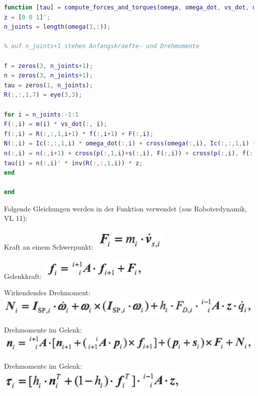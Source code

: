 \begin{lstlisting}[frame=single, basicstyle=\footnotesize, language=Matlab]
function [tau] = compute_forces_and_torques(omega, omega_dot, vs_dot, m, Ic, p, s, R)
z = [0 0 1]';
n_joints = length(omega(1,:));

% auf n_joints+1 stehen Anfangskraefte- und Drehmomente

f = zeros(3, n_joints+1);
n = zeros(3, n_joints+1);
tau = zeros(1, n_joints);
R(:,:,1,7) = eye(3,3);

for i = n_joints:-1:1
F(:,i) = m(i) * vs_dot(:, i);
f(:,i) = R(:,:,1,i+1) * f(:,i+1) + F(:,i);
N(:,i) = Ic(:,:,1,i) * omega_dot(:,i) + cross(omega(:,i), Ic(:,:,1,i) * omega(:,i));
n(:,i) = n(:,i+1) + cross(p(:,1,i)+s(:,i), F(:,i)) + cross(p(:,i), f(:,i+1)) + N(:,i);
tau(i) = n(:,i)' * inv(R(:,:,1,i)) * z;
end

end
\end{lstlisting}

Folgende Gleichungen werden in der Funktion verwendet (aus Roboterdynamik, VL 11):


Kraft an einem Schwerpunkt: \; \includegraphics[width=0.15\linewidth]{grafic/Fi_gleichung} 

Gelenkkraft: \; \includegraphics[width=0.28\linewidth]{grafic/klein_fi_gleichung} 

Wirkendendes Drehmoment: \includegraphics[width=0.62\linewidth]{grafic/gross_n_gleichung} 

Drehmomente im Gelenk: \includegraphics[width=0.68\linewidth]{grafic/klein_n_gleichung} 

Drehmomente im Gelenk: \includegraphics[width=0.5\linewidth]{grafic/tau_gleichung} 

